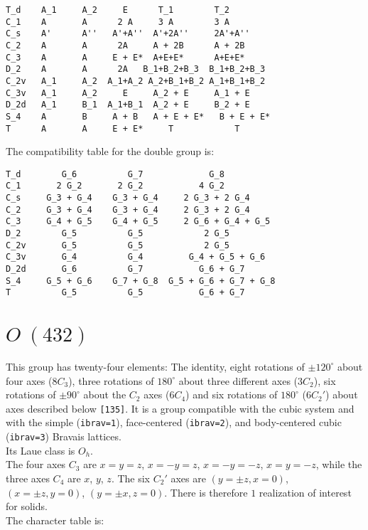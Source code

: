 \documentclass[12pt,a4paper,twoside]{report}
\begin{document}
\begin{tcolorbox}
\begin{footnotesize}
\begin{verbatim}
T_d    A_1     A_2     E      T_1        T_2
C_1    A       A      2 A     3 A        3 A
C_s    A'      A''   A'+A''  A'+2A''     2A'+A''
C_2    A       A      2A     A + 2B      A + 2B
C_3    A       A     E + E*  A+E+E*      A+E+E*
D_2    A       A      2A   B_1+B_2+B_3  B_1+B_2+B_3
C_2v   A_1     A_2  A_1+A_2 A_2+B_1+B_2 A_1+B_1+B_2
C_3v   A_1     A_2     E     A_2 + E     A_1 + E   
D_2d   A_1     B_1  A_1+B_1  A_2 + E     B_2 + E
S_4    A       B     A + B   A + E + E*   B + E + E*  
T      A       A     E + E*     T            T
\end{verbatim}
\end{footnotesize}
\end{tcolorbox}

The compatibility table for the double group is:

\begin{tcolorbox}
\begin{footnotesize}
\begin{verbatim}
T_d        G_6          G_7             G_8
C_1       2 G_2       2 G_2           4 G_2
C_s     G_3 + G_4    G_3 + G_4     2 G_3 + 2 G_4
C_2     G_3 + G_4    G_3 + G_4     2 G_3 + 2 G_4
C_3     G_4 + G_5    G_4 + G_5     2 G_6 + G_4 + G_5
D_2        G_5          G_5            2 G_5
C_2v       G_5          G_5            2 G_5
C_3v       G_4          G_4         G_4 + G_5 + G_6
D_2d       G_6          G_7           G_6 + G_7
S_4     G_5 + G_6    G_7 + G_8  G_5 + G_6 + G_7 + G_8  
T          G_5          G_5           G_6 + G_7
\end{verbatim}
\end{footnotesize}
\end{tcolorbox}


\newpage
{\color{coral}\section{$O\ (432)$}} 
\color{black}
This group has twenty-four elements: The identity, eight rotations 
of $\pm120^\circ$ about four axes ($8C_3$), three rotations of 
$180^\circ$ about three different axes ($3C_2$), six
rotations of $\pm90^\circ$ about the $C_2$ axes ($6C_4$) and
six rotations of $180^\circ$ ($6C_2'$) about axes described below
\texttt{[135]}.
It is a group compatible with the cubic system and with the  
simple (\texttt{ibrav=1}), face-centered (\texttt{ibrav=2}), 
and body-centered cubic (\texttt{ibrav=3}) Bravais lattices. \\
Its Laue class is $O_{h}$. \\
The four axes $C_3$ are $x=y=z$, $x=-y=z$, $x=-y=-z$, $x=y=-z$, while
the three axes $C_4$ are $x$, $y$, $z$. 
The six $C_2'$ axes are $(y=\pm z, x=0)$, $(x=\pm z, y=0)$, $(y=\pm x, z=0)$.
There is therefore $1$ realization of interest for solids. \\
The character table is:
\end{document}

